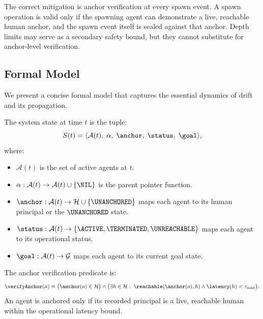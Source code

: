 The correct mitigation is anchor verification at every spawn event. A spawn operation is valid only if the spawning agent can demonstrate a live, reachable human anchor, and the spawn event itself is sealed against that anchor. Depth limits may serve as a secondary safety bound, but they cannot substitute for anchor-level verification.

\subsection{Formal Model}

We present a concise formal model that captures the essential dynamics of drift and its propagation.

\begin{definition}
The system state at time $t$ is the tuple:
\begin{equation}
S(t) = \langle \mathcal{A}(t),\; \alpha,\; \anchor,\; \status,\; \goal \rangle,
\end{equation}
where:
\begin{itemize}
    \item $\mathcal{A}(t)$ is the set of active agents at $t$.
    \item $\alpha: \mathcal{A}(t) \rightarrow \mathcal{A}(t) \cup \{\NIL\}$ is the parent pointer function.
    \item $\anchor: \mathcal{A}(t) \rightarrow \mathcal{H} \cup \{\UNANCHORED\}$ maps each agent to its human principal or the $\UNANCHORED$ state.
    \item $\status: \mathcal{A}(t) \rightarrow \{\ACTIVE, \TERMINATED, \UNREACHABLE\}$ maps each agent to its operational status.
    \item $\goal: \mathcal{A}(t) \rightarrow \mathcal{G}$ maps each agent to its current goal state.
\end{itemize}
\end{definition}

\begin{definition}
The anchor verification predicate is:
\begin{equation}
\verifyAnchor(a) \equiv \bigl( \anchor(a) \in \mathcal{H} \bigr) \land \bigl( \exists h \in \mathcal{H}:\; \reachable(\anchor(a), h) \land \latency(h) < \tau_{\max} \bigr).
\label{eq:verify-anchor}
\end{equation}
An agent is anchored only if its recorded principal is a live, reachable human within the operational latency bound.
\end{definition}

